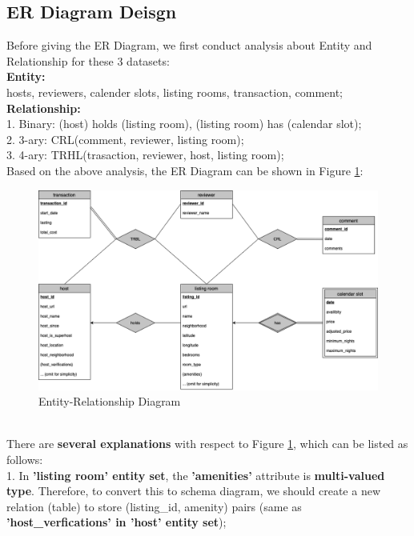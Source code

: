 \documentclass{article}
\begin{document}
	\subsection{ER Diagram Deisgn}
	Before giving the ER Diagram, we first conduct analysis about Entity and Relationship for these 3 datasets:
	\vspace{3pt}
	\\
	\textbf{Entity:}
	\\
	hosts, reviewers, calender slots, listing rooms, transaction, comment;
	\vspace{3pt}
	\\
	\textbf{Relationship: }
	\\
	1. Binary: (host) holds (listing room), (listing room) has (calendar slot);
	\\
	2. 3-ary: CRL(comment, reviewer, listing room);
	\\
	3. 4-ary: TRHL(trasaction, reviewer, host, listing room);
	\vspace{3pt}
	\\
	Based on the above analysis, the ER Diagram can be shown in Figure \ref{fig:011}:
	\begin{figure}[h]
		\centering
		\includegraphics[width=.5\textheight]{er.png}
		\caption{Entity-Relationship Diagram}
		\label{fig:011}
	\end{figure}
	\vspace{3pt}
	\\
	There are \textbf{several explanations} with respect to Figure \ref{fig:011}, which can be listed as follows:
	\vspace{3pt}
	\\
	1. In \textbf{'listing room' entity set}, the \textbf{'amenities'} attribute is \textbf{multi-valued type}. Therefore, to convert this to schema diagram, we should create a new relation (table) to store (listing\_id, amenity) pairs (same as \textbf{'host\_verfications' in 'host' entity set});
\end{document}

